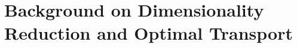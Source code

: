 \chapter{Background on Dimensionality Reduction and Optimal Transport}\label{chapter:Background}






